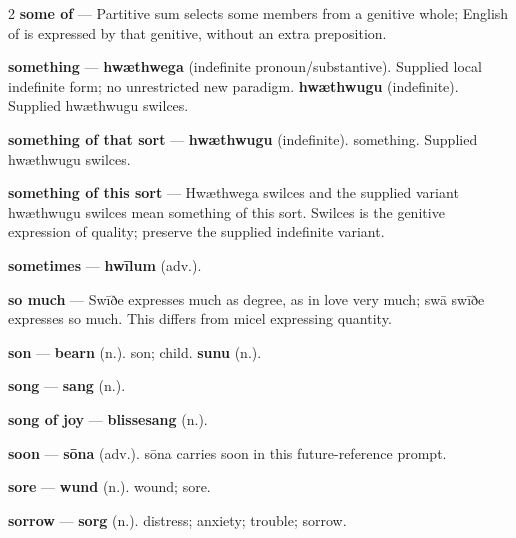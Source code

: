 \begin{multicols}{2}
\textbf{some of} — Partitive sum selects some members from a genitive whole; English of is expressed by that genitive, without an extra preposition.\par
\textbf{something} — \textbf{hwæthwega} (indefinite pronoun/substantive). Supplied local indefinite form; no unrestricted new paradigm. \textbf{hwæthwugu} (indefinite). Supplied hwæthwugu swilces.\par
\textbf{something of that sort} — \textbf{hwæthwugu} (indefinite). something. Supplied hwæthwugu swilces.\par
\textbf{something of this sort} — Hwæthwega swilces and the supplied variant hwæthwugu swilces mean something of this sort. Swilces is the genitive expression of quality; preserve the supplied indefinite variant.\par
\textbf{sometimes} — \textbf{hwīlum} (adv.).\par
\textbf{so much} — Swīðe expresses much as degree, as in love very much; swā swīðe expresses so much. This differs from micel expressing quantity.\par
\textbf{son} — \textbf{bearn} (n.). son; child. \textbf{sunu} (n.).\par
\textbf{song} — \textbf{sang} (n.).\par
\textbf{song of joy} — \textbf{blissesang} (n.).\par
\textbf{soon} — \textbf{sōna} (adv.). sōna carries soon in this future-reference prompt.\par
\textbf{sore} — \textbf{wund} (n.). wound; sore.\par
\textbf{sorrow} — \textbf{sorg} (n.). distress; anxiety; trouble; sorrow.\par

\end{multicols}
